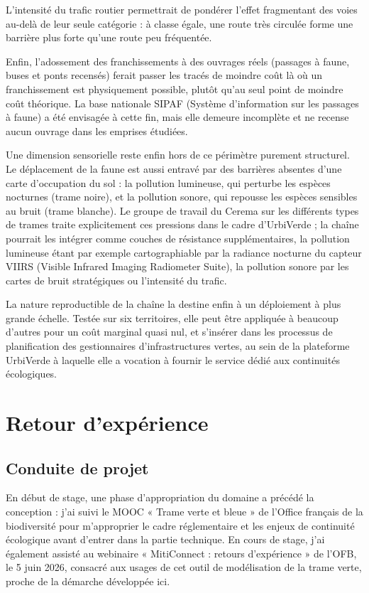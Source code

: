 \documentclass[a4paper,11pt]{report}
\begin{document}
L'intensité du trafic routier permettrait de pondérer l'effet fragmentant des voies au-delà de leur seule catégorie : à classe égale, une route très circulée forme une barrière plus forte qu'une route peu fréquentée.

Enfin, l'adossement des franchissements à des ouvrages réels (passages à faune, buses et ponts recensés) ferait passer les tracés de moindre coût là où un franchissement est physiquement possible, plutôt qu'au seul point de moindre coût théorique. La base nationale SIPAF (Système d'information sur les passages à faune) a été envisagée à cette fin, mais elle demeure incomplète et ne recense aucun ouvrage dans les emprises étudiées.

Une dimension sensorielle reste enfin hors de ce périmètre purement structurel. Le déplacement de la faune est aussi entravé par des barrières absentes d'une carte d'occupation du sol : la pollution lumineuse, qui perturbe les espèces nocturnes (trame noire), et la pollution sonore, qui repousse les espèces sensibles au bruit (trame blanche). Le groupe de travail du Cerema sur les différents types de trames traite explicitement ces pressions dans le cadre d'UrbiVerde ; la chaîne pourrait les intégrer comme couches de résistance supplémentaires, la pollution lumineuse étant par exemple cartographiable par la radiance nocturne du capteur VIIRS (Visible Infrared Imaging Radiometer Suite), la pollution sonore par les cartes de bruit stratégiques ou l'intensité du trafic.

La nature reproductible de la chaîne la destine enfin à un déploiement à plus grande échelle. Testée sur six territoires, elle peut être appliquée à beaucoup d'autres pour un coût marginal quasi nul, et s'insérer dans les processus de planification des gestionnaires d'infrastructures vertes, au sein de la plateforme UrbiVerde à laquelle elle a vocation à fournir le service dédié aux continuités écologiques.

\chapter{Retour d'expérience}\label{chap:6}

\section{Conduite de projet}\label{sec:6.1}

En début de stage, une phase d'appropriation du domaine a précédé la conception : j'ai suivi le MOOC « Trame verte et bleue » de l'Office français de la biodiversité pour m'approprier le cadre réglementaire et les enjeux de continuité écologique avant d'entrer dans la partie technique. En cours de stage, j'ai également assisté au webinaire « MitiConnect : retours d'expérience » de l'OFB, le 5 juin 2026, consacré aux usages de cet outil de modélisation de la trame verte, proche de la démarche développée ici.
\end{document}
